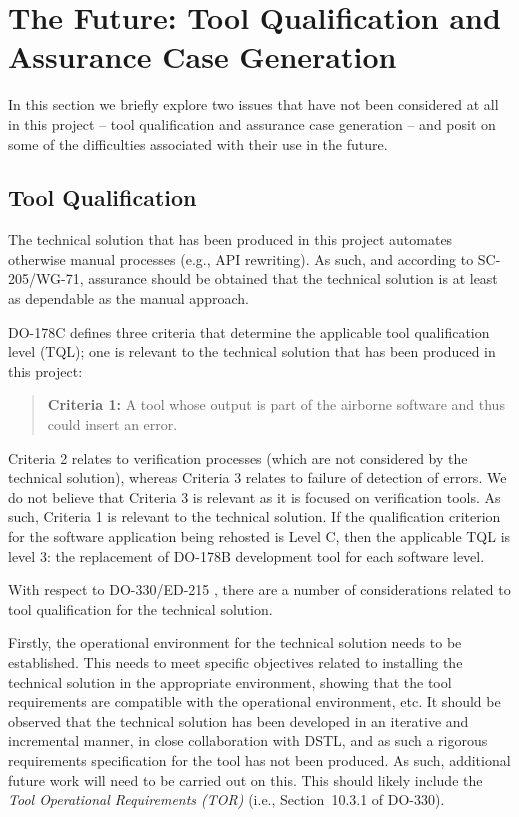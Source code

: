 \documentclass{llncs}
\begin{document}
\section{The Future: Tool Qualification and Assurance Case Generation}
\label{sec:future}
In this section we briefly explore two issues that have not been considered at all in this project -- tool qualification and assurance case generation -- and posit on some of the difficulties associated with their use in the future.

\subsection{Tool Qualification}
The technical solution that has been produced in this project automates otherwise manual processes (e.g., API rewriting). As such, and according to SC-205/WG-71, assurance should be obtained that the technical solution is at least as dependable as the manual approach. 

DO-178C defines three criteria that determine the applicable tool qualification level (TQL); one is relevant to the technical solution that has been produced in this project:

\begin{quotation}
\textbf{Criteria 1:} A tool whose output is part of the airborne software and thus could insert an error.
\end{quotation}
Criteria 2 relates to verification processes (which are not considered by the technical solution), whereas Criteria 3 relates to failure of detection of errors. We do not believe that Criteria 3 is relevant as it is focused on verification tools. As such, Criteria 1 is relevant to the technical solution. If the qualification criterion for the software application being rehosted is Level C, then the applicable TQL is level 3: the replacement of DO-178B development tool for each software level.

With respect to DO-330/ED-215 \cite{DO330}, there are a number of considerations related to tool qualification for the technical solution. 

Firstly, the operational environment for the technical solution needs to be established. This needs to meet specific objectives related to installing the technical solution in the appropriate environment, showing that the tool requirements are compatible with the operational environment, etc. It should be observed that the technical solution has been developed in an iterative and incremental manner, in close collaboration with DSTL, and as such a rigorous requirements specification for the tool has not been produced. As such, additional future work will need to be carried out on this. This should likely include the \textit{Tool Operational Requirements (TOR)} (i.e., Section~10.3.1 of DO-330). 
\end{document}

